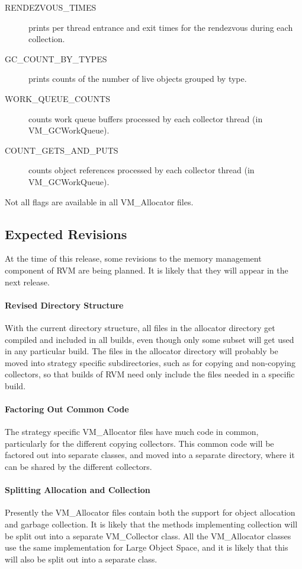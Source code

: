 \begin{description}
\item[RENDEZVOUS\_TIMES] prints per thread entrance and exit times for the
rendezvous during each collection.
\item[GC\_COUNT\_BY\_TYPES] prints counts of the number of live objects grouped
by type.
\item[WORK\_QUEUE\_COUNTS] counts work queue buffers processed by each collector
thread (in VM\_GCWorkQueue). 
\item[COUNT\_GETS\_AND\_PUTS] counts object references processed by each collector
thread (in VM\_GCWorkQueue). 
\end{description}
Not all flags are available in all VM\_Allocator files.

\subsection{Expected Revisions} \label{sssec:revisions}
At the time of this release, some revisions to the
memory management component of RVM
are being planned.  It is likely that they will appear in
the next release.

\paragraph{Revised Directory Structure}
With the current directory structure, all files in the allocator
directory get compiled and included in all builds, even though
only some subset will get used in any particular build.  The 
files in the allocator directory will probably be moved into strategy
specific subdirectories, such as for copying and non-copying 
collectors, so that builds of RVM need only include the files
needed in a specific build.

\paragraph{Factoring Out Common Code}
The strategy specific VM\_Allocator files have much code in common,
particularly for the different copying collectors.  This common code
will be factored out into separate classes, and moved into a
separate directory, where it can be shared by the different collectors.

\paragraph{Splitting Allocation and Collection}
Presently the VM\_Allocator files contain both the support for
object allocation and garbage collection.  It is likely that
the methods implementing collection will be split out into
a separate VM\_Collector class.  All the VM\_Allocator classes use
the same implementation for Large Object Space, and it is likely
that this will also be split out into a separate class.

